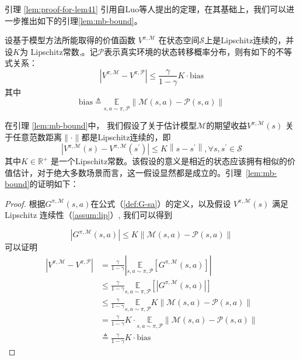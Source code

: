 引理 \ref{lem:proof-for-lem41} 引用自Luo等人提出的定理，在其基础上，我们可以进一步推出如下的引理\ref{lem:mb-bound}。

\begin{lemma}\label{lem:mb-bound}
设基于模型方法所能取得的价值函数 ${V}^{\pi,\mathcal{M}}$ 在状态空间$\mathcal{S}$上是Lipschitz连续的，并设$K$为 Lipschitz常数,。记$\mathcal{P}$表示真实环境的状态转移概率分布，则有如下的不等式关系：
\begin{equation}
\left|{V}^{\pi, \mathcal{M}}-{V}^{\pi, \mathcal{P}}\right| \leq\frac{\gamma}{1-\gamma}K\cdot\mathrm{bias}
\end{equation}
其中
\begin{equation}
\mathrm{bias} \triangleq \underset{s,a\sim \pi,\mathcal{P}}{\mathbb{E}}\left\|\mathcal{M}(s, a)-\mathcal{P}(s, a)\right\|
\end{equation}

\label{theo:mb-bound}
\end{lemma}

在引理 \ref{lem:mb-bound}中， 我们假设了关于估计模型$\mathcal{M}$的期望收益${V}^{\pi,\mathcal{M}}(s)$ 关于任意范数距离$\|\cdot\|$都是Lipschitz连续的，即
\begin{equation}\label{assum:lip}
    \left|{V}^{\pi,\mathcal{M}}(s)-{V}^{\pi,\mathcal{M}}(s^{\prime})\right| \leq K\left\|s-s^{\prime}\right\|, \forall s, s^{\prime} \in \mathcal{S}
\end{equation}
其中$K\in \mathbb{R}^+$ 是一个Lipschitz常数。该假设的意义是相近的状态应该拥有相似的价值估计，对于绝大多数场景而言，这一假设显然都是成立的。引理~\ref{lem:mb-bound}的证明如下：

\begin{proof}

根据$G^{\pi,\mathcal{M}}(s,a)$在公式（\ref{def:G-sa}）的定义，以及假设 ${V}^{\pi,\mathcal{M}}(s)$ 满足 Lipschitz 连续性（\ref{assum:lip}）, 我们可以得到

\begin{equation}\label{eq:G-leq}
|G^{\pi,\mathcal{M}}(s,a)|\leq K\|\mathcal{M}(s,a)-\mathcal{P}(s,a)\|
\end{equation}
可以证明
\begin{align*}
\left|{V}^{\pi, \mathcal{M}}-{V}^{\pi, \mathcal{P}}\right| &= \frac{\gamma}{1-\gamma}\left|\underset{s,a\sim\pi,\mathcal{P}}{\mathbb{E}}\left[G^{\pi,\mathcal{M}}(s,a)\right]\right|\\
&\leq \frac{\gamma}{1-\gamma}\underset{s,a\sim\pi,\mathcal{P}}{\mathbb{E}}\left[\left|G^{\pi,\mathcal{M}}(s,a)\right|\right]\\
&\leq \frac{\gamma}{1-\gamma}\underset{s,a\sim\pi,\mathcal{P}}{\mathbb{E}}K\|\mathcal{M}(s,a)-\mathcal{P}(s,a)\|\\
&= \frac{\gamma}{1-\gamma}K\cdot\underset{s,a\sim\pi,\mathcal{P}}{\mathbb{E}}\|\mathcal{M}(s,a)-\mathcal{P}(s,a)\|\\
&\triangleq \frac{\gamma}{1-\gamma}K\cdot\mathrm{bias}
\end{align*}

\end{proof}

